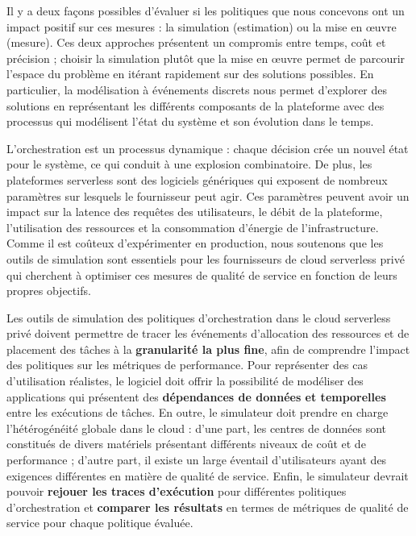 Il y a deux façons possibles d'évaluer si les politiques que nous concevons ont un impact positif sur ces mesures : la simulation (estimation) ou la mise en œuvre (mesure). Ces deux approches présentent un compromis entre temps, coût et précision ; choisir la simulation plutôt que la mise en œuvre permet de parcourir l'espace du problème en itérant rapidement sur des solutions possibles. En particulier, la modélisation à événements discrets nous permet d'explorer des solutions en représentant les différents composants de la plateforme avec des processus qui modélisent l'état du système et son évolution dans le temps.

L'orchestration est un processus dynamique : chaque décision crée un nouvel état pour le système, ce qui conduit à une explosion combinatoire. De plus, les plateformes serverless sont des logiciels génériques qui exposent de nombreux paramètres sur lesquels le fournisseur peut agir. Ces paramètres peuvent avoir un impact sur la latence des requêtes des utilisateurs, le débit de la plateforme, l'utilisation des ressources et la consommation d'énergie de l'infrastructure. Comme il est coûteux d'expérimenter en production, nous soutenons que les outils de simulation sont essentiels pour les fournisseurs de cloud serverless privé qui cherchent à optimiser ces mesures de qualité de service en fonction de leurs propres objectifs.

Les outils de simulation des politiques d'orchestration dans le cloud serverless privé doivent permettre de tracer les événements d'allocation des ressources et de placement des tâches à la \textbf{granularité la plus fine}, afin de comprendre l'impact des politiques sur les métriques de performance. Pour représenter des cas d'utilisation réalistes, le logiciel doit offrir la possibilité de modéliser des applications qui présentent des \textbf{dépendances de données et temporelles} entre les exécutions de tâches. En outre, le simulateur doit prendre en charge l'hétérogénéité globale dans le cloud : d'une part, les centres de données sont constitués de divers matériels présentant différents niveaux de coût et de performance ; d'autre part, il existe un large éventail d'utilisateurs ayant des exigences différentes en matière de qualité de service. Enfin, le simulateur devrait pouvoir \textbf{rejouer les traces d'exécution} pour différentes politiques d'orchestration et \textbf{comparer les résultats} en termes de métriques de qualité de service pour chaque politique évaluée.


